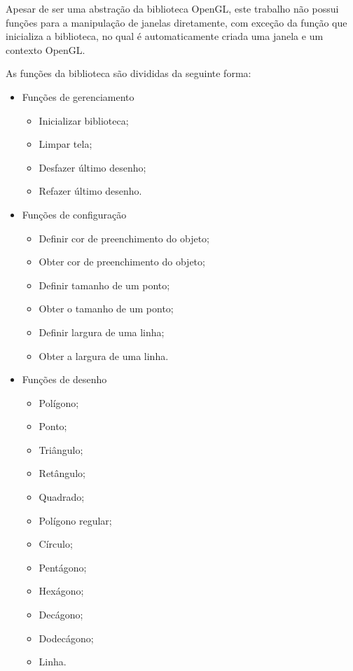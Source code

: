 \documentclass[12pt, %
openright,
oneside, %
a4paper,    %
brazil]{facom-ufu-abntex2}
\begin{document}
Apesar de ser uma abstração da biblioteca OpenGL, este trabalho não possui funções para a manipulação de janelas diretamente, com exceção da função que inicializa a biblioteca, no qual é automaticamente criada uma janela e um contexto OpenGL.

As funções da biblioteca são divididas da seguinte forma:
\begin{itemize}

    \item Funções de gerenciamento
    \begin{itemize}
    \item Inicializar biblioteca;
    \item Limpar tela;
    \item Desfazer último desenho;
    \item Refazer último desenho.
    \end{itemize}

    \item Funções de configuração
    \begin{itemize}
    \item Definir cor de preenchimento do objeto;
    \item Obter cor de preenchimento do objeto;
    \item Definir tamanho de um ponto;
    \item Obter o tamanho de um ponto;
    \item Definir largura de uma linha;
    \item Obter a largura de uma linha.
    \end{itemize}

    \item Funções de desenho
    \begin{itemize}

    \item Polígono;
    \item Ponto;
    \item Triângulo;
    \item Retângulo;
    \item Quadrado;
    \item Polígono regular;
    \item Círculo;
    \item Pentágono;
    \item Hexágono;
    \item Decágono;
    \item Dodecágono;
    \item Linha.

    \end{itemize}
\end{itemize}
\end{document}
